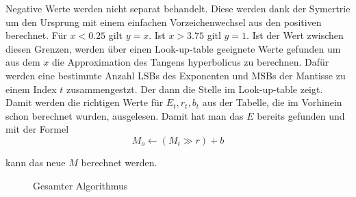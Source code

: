 Negative Werte werden nicht separat behandelt. Diese werden dank der Symertrie um den Ursprung mit einem einfachen Vorzeichenwechsel aus den positiven berechnet.
Für $x < 0.25$ gilt $y = x$.
Ist $x > 3.75$ gitl $y = 1$.
Ist der Wert zwischen diesen Grenzen, werden über einen Look-up-table geeignete Werte gefunden um aus dem $x$ die Approximation des Tangens hyperbolicus zu berechnen.
Dafür werden eine bestimmte Anzahl LSBs des Exponenten und MSBs der Mantisse zu einem Index $t$ zusammengestzt. Der dann die Stelle im Look-up-table zeigt.
Damit werden die richtigen Werte für $E_{t}, r_{t}, b_{t}$ aus der Tabelle, die im Vorhinein schon berechnet wurden, ausgelesen.
Damit hat man das $E$ bereits gefunden und mit der Formel
\[
    M_{o} \leftarrow\left(M_{i} \gg r\right)+b
\]

kann das neue $M$ berechnet werden.

\begin{figure}
\centering
{}
\caption{Gesamter Algorithmus
\label{motivation:figure:gesalgo}}
\end{figure}

